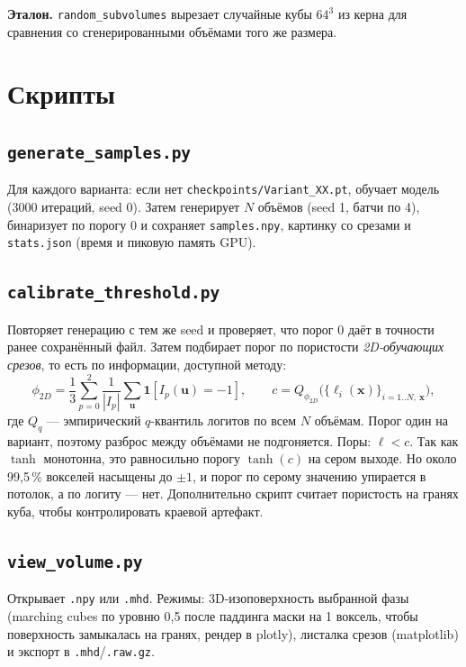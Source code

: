 \documentclass[11pt,a4paper]{article}
\newcommand{\code}[1]{\texttt{#1}}
\begin{document}
\textbf{Эталон.} \code{random\_subvolumes} вырезает случайные кубы $64^3$ из керна для сравнения со
сгенерированными объёмами того же размера.

\section{Скрипты}

\subsection{\code{generate\_samples.py}}
Для каждого варианта: если нет \code{checkpoints/Variant\_XX.pt}, обучает модель (3000 итераций, seed 0).
Затем генерирует $N$ объёмов (seed 1, батчи по 4), бинаризует по порогу 0 и сохраняет
\code{samples.npy}, картинку со срезами и \code{stats.json} (время и пиковую память GPU).

\subsection{\code{calibrate\_threshold.py}}
Повторяет генерацию с тем же seed и проверяет, что порог 0 даёт в точности ранее сохранённый файл.
Затем подбирает порог по пористости \emph{2D-обучающих срезов}, то есть по информации, доступной методу:
\[
  \phi_{2D} = \frac13\sum_{p=0}^{2}\frac{1}{|I_p|}\sum_{\mathbf u}\mathbf{1}[I_p(\mathbf u)=-1],\qquad
  c = Q_{\phi_{2D}}\big(\{\ell_i(\mathbf x)\}_{i=1..N,\ \mathbf x}\big),
\]
где $Q_q$ — эмпирический $q$-квантиль логитов по всем $N$ объёмам. Порог один на вариант, поэтому
разброс между объёмами не подгоняется. Поры: $\ell<c$. Так как $\tanh$ монотонна, это равносильно порогу
$\tanh(c)$ на сером выходе. Но около 99{,}5\,\% вокселей насыщены до $\pm1$, и порог по серому значению
упирается в потолок, а по логиту — нет. Дополнительно скрипт считает пористость на гранях куба, чтобы
контролировать краевой артефакт.

\subsection{\code{view\_volume.py}}
Открывает \code{.npy} или \code{.mhd}. Режимы: 3D-изоповерхность выбранной фазы (marching cubes по уровню
0{,}5 после паддинга маски на 1 воксель, чтобы поверхность замыкалась на гранях, рендер в plotly),
листалка срезов (matplotlib) и экспорт в \code{.mhd}/\code{.raw.gz}.

\end{document}
